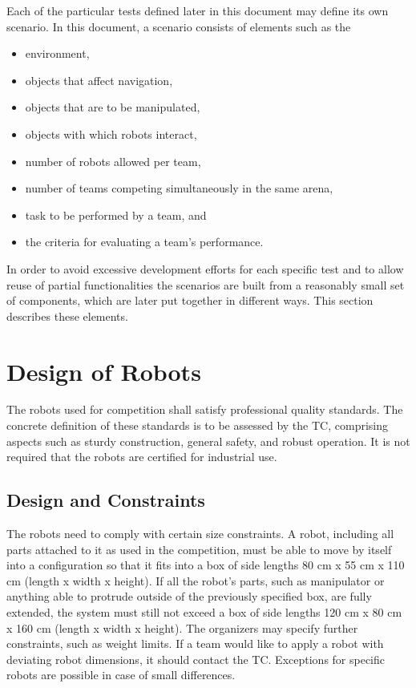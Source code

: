 
Each of the particular tests defined later in this document may define its own scenario. In this document, a scenario consists of elements such as the

\begin{itemize}
	\item environment,
	\item objects that affect navigation,
	\item objects that are to be manipulated,
	\item objects with which robots interact,
	\item number of robots allowed per team,
	\item number of teams competing simultaneously in the same arena,
	\item task to be performed by a team, and
	\item the criteria for evaluating a team's performance.
\end{itemize}

In order to avoid excessive development efforts for each specific test and to allow reuse of partial functionalities the scenarios are built from a reasonably small set of components, which are later put together in different ways. This section describes these elements.

\section{Design of Robots}
The robots used for competition shall satisfy professional quality standards. The concrete definition of these standards is to be assessed by the TC, comprising aspects such as sturdy construction, general safety, and robust operation. It is not required that the robots are certified for industrial use.

\subsection{Design and Constraints} \label{ssec:RobotDesignAndConstraints}
The robots need to comply with certain size constraints. A robot, including all parts attached to it as used in the competition, must be able to move by itself into a configuration so that it fits into a box of side lengths 80 cm x 55 cm x 110 cm (length x width x height). If all the robot's parts, such as manipulator or anything able to protrude outside of the previously specified box, are fully extended, the system must still not exceed a box of side lengths 120 cm x 80 cm x 160 cm (length x width x height). The organizers may specify further constraints, such as weight limits. If a team would like to apply a robot with deviating robot dimensions, it should contact the TC. Exceptions for specific robots are possible in case of small differences.

